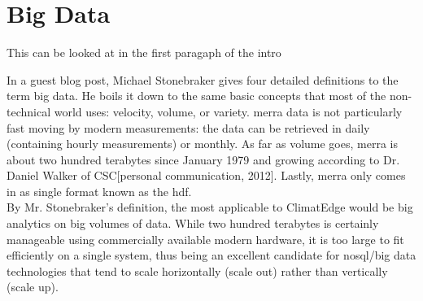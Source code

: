 \chapter{Big Data}



This can be looked at in the first paragaph of the intro


In a guest blog post, Michael Stonebraker gives four detailed definitions to the term big data\cite{stonebraker}. He boils it down to the same basic concepts that most of the non-technical world uses: velocity, volume, or variety. \gls{merra} data is not particularly fast moving by modern measurements: the data can be retrieved in daily (containing hourly measurements) or monthly. As far as volume goes, \gls{merra} is about two hundred terabytes since January 1979 and growing according to Dr. Daniel Walker of CSC[personal communication, 2012]. Lastly, \gls{merra} only comes in as single format known as the \gls{hdf}\cite{hdf}.\\

By Mr. Stonebraker's definition, the most applicable to ClimatEdge\texttrademark{} would be big analytics on big volumes of data. While two hundred terabytes is certainly manageable using commercially available modern hardware, it is too large to fit efficiently on a single system, thus being an excellent candidate for \gls{nosql}/big data technologies that tend to scale horizontally (scale out) rather than vertically (scale up).




\renewcommand\bibname{{References}}





